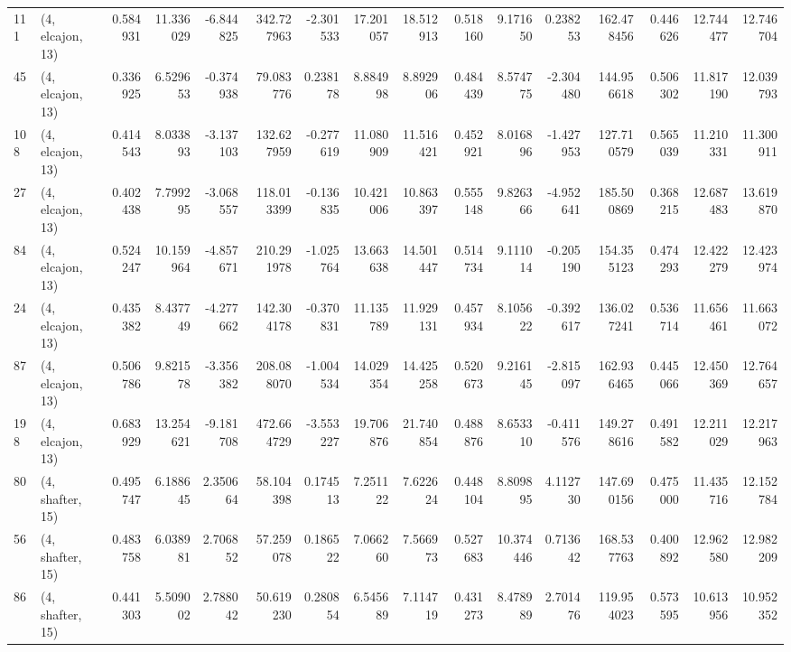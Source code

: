 \begin{tabular}{llrrrrrrrrrrrrrr}
111 &  (4, elcajon, 13) &   0.584931 &  11.336029 & -6.844825 &  342.727963 & -2.301533 &  17.201057 &  18.512913 &  0.518160 &   9.171650 &   0.238253 &  162.478456 &  0.446626 &  12.744477 &  12.746704 \\
45  &  (4, elcajon, 13) &   0.336925 &   6.529653 & -0.374938 &   79.083776 &  0.238178 &   8.884998 &   8.892906 &  0.484439 &   8.574775 &  -2.304480 &  144.956618 &  0.506302 &  11.817190 &  12.039793 \\
108 &  (4, elcajon, 13) &   0.414543 &   8.033893 & -3.137103 &  132.627959 & -0.277619 &  11.080909 &  11.516421 &  0.452921 &   8.016896 &  -1.427953 &  127.710579 &  0.565039 &  11.210331 &  11.300911 \\
27  &  (4, elcajon, 13) &   0.402438 &   7.799295 & -3.068557 &  118.013399 & -0.136835 &  10.421006 &  10.863397 &  0.555148 &   9.826366 &  -4.952641 &  185.500869 &  0.368215 &  12.687483 &  13.619870 \\
84  &  (4, elcajon, 13) &   0.524247 &  10.159964 & -4.857671 &  210.291978 & -1.025764 &  13.663638 &  14.501447 &  0.514734 &   9.111014 &  -0.205190 &  154.355123 &  0.474293 &  12.422279 &  12.423974 \\
24  &  (4, elcajon, 13) &   0.435382 &   8.437749 & -4.277662 &  142.304178 & -0.370831 &  11.135789 &  11.929131 &  0.457934 &   8.105622 &  -0.392617 &  136.027241 &  0.536714 &  11.656461 &  11.663072 \\
87  &  (4, elcajon, 13) &   0.506786 &   9.821578 & -3.356382 &  208.088070 & -1.004534 &  14.029354 &  14.425258 &  0.520673 &   9.216145 &  -2.815097 &  162.936465 &  0.445066 &  12.450369 &  12.764657 \\
198 &  (4, elcajon, 13) &   0.683929 &  13.254621 & -9.181708 &  472.664729 & -3.553227 &  19.706876 &  21.740854 &  0.488876 &   8.653310 &  -0.411576 &  149.278616 &  0.491582 &  12.211029 &  12.217963 \\
80  &  (4, shafter, 15) &   0.495747 &   6.188645 &  2.350664 &   58.104398 &  0.174513 &   7.251122 &   7.622624 &  0.448104 &   8.809895 &   4.112730 &  147.690156 &  0.475000 &  11.435716 &  12.152784 \\
56  &  (4, shafter, 15) &   0.483758 &   6.038981 &  2.706852 &   57.259078 &  0.186522 &   7.066260 &   7.566973 &  0.527683 &  10.374446 &   0.713642 &  168.537763 &  0.400892 &  12.962580 &  12.982209 \\
86  &  (4, shafter, 15) &   0.441303 &   5.509002 &  2.788042 &   50.619230 &  0.280854 &   6.545689 &   7.114719 &  0.431273 &   8.478989 &   2.701476 &  119.954023 &  0.573595 &  10.613956 &  10.952352 \\

\end{tabular}
